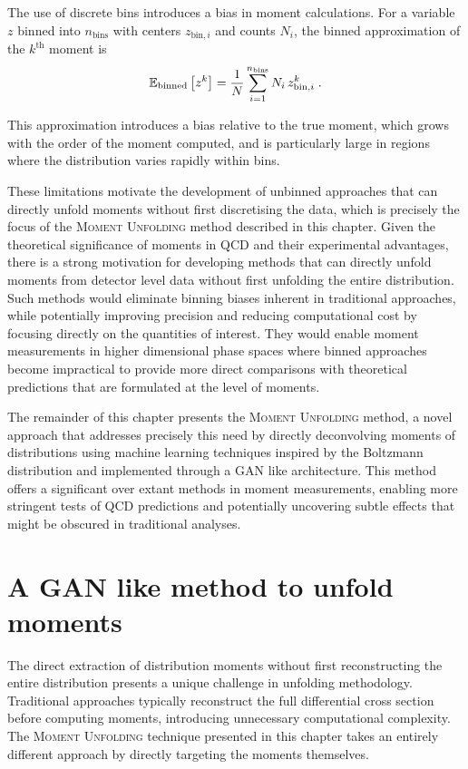             The use of discrete bins introduces a bias in moment calculations.
            For a variable $z$ binned into $n_{\text{bins}}$ with centers $z_{\text{bin},i}$ and counts $N_i$, the binned approximation of the $k^{\text{th}}$ moment is
            \[
                \operatorname{\mathbb{E}}_{\text{binned}}\qty[z^k] = \frac{1}{N} \sum_{i=1}^{n_{\text{bins}}} N_i \, z_{\text{bin},i}^k\;.
            \]
            
            This approximation introduces a bias relative to the true moment, which grows with the order of the moment computed, and is particularly large in regions where the distribution varies rapidly within bins.
    
            These limitations motivate the development of unbinned approaches that can directly unfold moments without first discretising the data, which is precisely the focus of the \textsc{Moment Unfolding} method described in this chapter.
            Given the theoretical significance of moments in QCD and their experimental advantages, there is a strong motivation for developing methods that can directly unfold moments from detector level data without first unfolding the entire distribution.
            Such methods would eliminate binning biases inherent in traditional approaches, while potentially improving precision and reducing computational cost by focusing directly on the quantities of interest.
            They would enable moment measurements in higher dimensional phase spaces where binned approaches become impractical to provide more direct comparisons with theoretical predictions that are formulated at the level of moments.

        The remainder of this chapter presents the \textsc{Moment Unfolding} method, a novel approach that addresses precisely this need by directly deconvolving moments of distributions using machine learning techniques inspired by the Boltzmann distribution and implemented through a GAN like architecture.
        This method offers a significant over extant methods in moment measurements, enabling more stringent tests of QCD predictions and potentially uncovering subtle effects that might be obscured in traditional analyses.
        
\section{A GAN like method to unfold moments}
\sectionminitoc
    The direct extraction of distribution moments without first reconstructing the entire distribution presents a unique challenge in unfolding methodology.
    Traditional approaches typically reconstruct the full differential cross section before computing moments, introducing unnecessary computational complexity.
    The \textsc{Moment Unfolding} technique presented in this chapter takes an entirely different approach by directly targeting the moments themselves.

